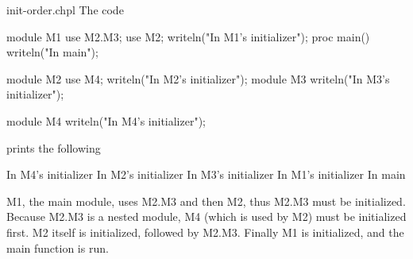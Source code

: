 \begin{chapelexample}{init-order.chpl}
The code
\begin{chapel}
module M1 {
  use M2.M3;
  use M2;
  writeln("In M1's initializer");
  proc main() {
    writeln("In main");
  }
}

module M2 {
  use M4;
  writeln("In M2's initializer");
  module M3 {
    writeln("In M3's initializer");
  }
}

module M4 {
  writeln("In M4's initializer");
}
\end{chapel}
prints the following
\begin{chapelprintoutput}{}
In M4's initializer
In M2's initializer
In M3's initializer
In M1's initializer
In main
\end{chapelprintoutput}
M1, the main module, uses M2.M3 and then M2, thus M2.M3 must be
initialized.  Because M2.M3 is a nested module, M4 (which is used by
M2) must be initialized first.  M2 itself is initialized, followed by
M2.M3.  Finally M1 is initialized, and the main function is run.
\end{chapelexample}

